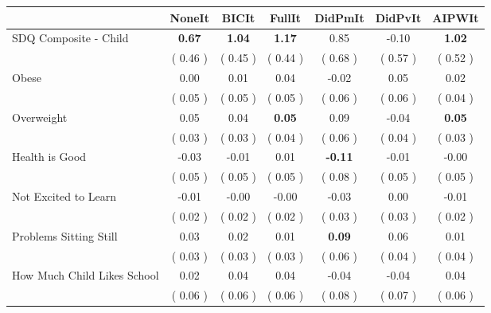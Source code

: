\begin{tabular}{l c c c c c c}
\toprule
 & NoneIt & BICIt & FullIt & DidPmIt & DidPvIt & AIPWIt \\
\midrule
SDQ Composite - Child & \textbf{      0.67 } & \textbf{      1.04 } & \textbf{      1.17 } &      0.85 &     -0.10 & \textbf{     1.02} \\
& (     0.46 ) & (     0.45 ) & (     0.44 ) & (     0.68 ) & (     0.57 ) & (     0.52 ) \\
Obese &      0.00 &      0.01 &      0.04 &     -0.02 &      0.05 &      0.02 \\
& (     0.05 ) & (     0.05 ) & (     0.05 ) & (     0.06 ) & (     0.06 ) & (     0.04 ) \\
Overweight &      0.05 &      0.04 & \textbf{      0.05 } &      0.09 &     -0.04 & \textbf{     0.05} \\
& (     0.03 ) & (     0.03 ) & (     0.04 ) & (     0.06 ) & (     0.04 ) & (     0.03 ) \\
Health is Good &     -0.03 &     -0.01 &      0.01 & \textbf{     -0.11 } &     -0.01 &     -0.00 \\
& (     0.05 ) & (     0.05 ) & (     0.05 ) & (     0.08 ) & (     0.05 ) & (     0.05 ) \\
Not Excited to Learn &     -0.01 &     -0.00 &     -0.00 &     -0.03 &      0.00 &     -0.01 \\
& (     0.02 ) & (     0.02 ) & (     0.02 ) & (     0.03 ) & (     0.03 ) & (     0.02 ) \\
Problems Sitting Still &      0.03 &      0.02 &      0.01 & \textbf{      0.09 } &      0.06 &      0.01 \\
& (     0.03 ) & (     0.03 ) & (     0.03 ) & (     0.06 ) & (     0.04 ) & (     0.04 ) \\
How Much Child Likes School &      0.02 &      0.04 &      0.04 &     -0.04 &     -0.04 &      0.04 \\
& (     0.06 ) & (     0.06 ) & (     0.06 ) & (     0.08 ) & (     0.07 ) & (     0.06 ) \\
\bottomrule
\end{tabular}
